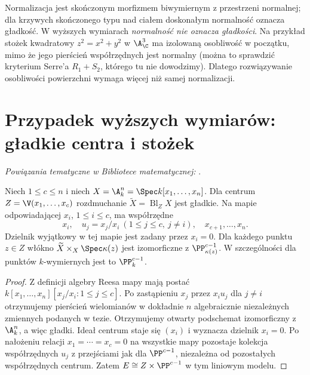 \begin{uwaga}
Normalizacja jest skończonym morfizmem biwymiernym
z przestrzeni normalnej; dla krzywych skończonego typu
nad ciałem doskonałym normalność oznacza gładkość.
W wyższych wymiarach \emph{normalność nie oznacza
gładkości}. Na przykład stożek kwadratowy
$z^2=x^2+y^2$ w $\A^3_\C$ ma izolowaną osobliwość
w początku, mimo że jego pierścień współrzędnych
jest normalny (można to sprawdzić kryterium Serre'a
$R_1+S_2$, którego tu nie dowodzimy).
Dlatego rozwiązywanie osobliwości powierzchni
wymaga więcej niż samej normalizacji.
\end{uwaga}

\section{Przypadek wyższych wymiarów: gładkie centra i stożek}
\label{sec:ga5-higherdim}

\noindent\emph{Powiązania tematyczne w Bibliotece matematycznej:} .


\begin{twierdzenie}
\label{tw:ga5-smooth-center-model}
Niech $1\le c\le n$ i niech
$X=\A^n_k=\Spec k[x_1,\ldots,x_n]$.
Dla centrum $Z=\V(x_1,\ldots,x_c)$ rozdmuchanie
$\widetilde X=\operatorname{Bl}_Z X$ jest gładkie.
Na mapie odpowiadającej $x_i$, $1\le i\le c$,
ma współrzędne
\[
 x_i,\quad u_j=x_j/x_i\ (1\le j\le c,\ j\ne i),
 \quad x_{c+1},\ldots,x_n.
\]
Dzielnik wyjątkowy w tej mapie jest zadany
przez $x_i=0$. Dla każdego punktu $z\in Z$ włókno
$\widetilde X\times_X\Spec\kappa(z)$ jest izomorficzne
z $\PP^{c-1}_{\kappa(z)}$. W szczególności dla punktów
$k$-wymiernych jest to $\PP^{c-1}_k$.
\end{twierdzenie}
\begin{proof}
Z definicji algebry Reesa mapy mają postać
$k[x_1,\ldots,x_n][x_j/x_i:1\le j\le c]$.
Po zastąpieniu $x_j$ przez $x_i u_j$ dla $j\ne i$
otrzymujemy pierścień wielomianów w dokładnie
$n$ algebraicznie niezależnych zmiennych podanych
w tezie. Otrzymujemy otwarty podschemat izomorficzny
z $\A^n_k$, a więc gładki.
Ideał centrum staje się $(x_i)$ i wyznacza dzielnik
$x_i=0$. Po nałożeniu relacji $x_1=\cdots=x_c=0$
na wszystkie mapy pozostaje kolekcja współrzędnych
$u_j$ z przejściami jak dla $\PP^{c-1}$,
niezależna od pozostałych współrzędnych centrum.
Zatem $E\cong Z\times\PP^{c-1}$ w tym liniowym modelu.
\end{proof}

